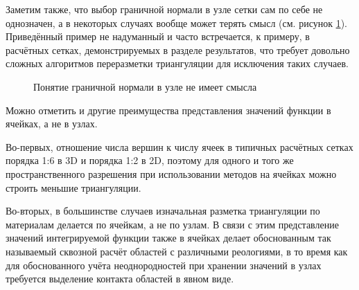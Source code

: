 Заметим также, что выбор граничной нормали в узле сетки сам по себе не однозначен, 
а в некоторых случаях вообще может терять смысл (см. рисунок \ref{pic:bad_normal}). 
Приведённый пример не надуманный и часто встречается, к примеру, в расчётных сетках, 
демонстрируемых в разделе результатов, что требует довольно сложных алгоритмов переразметки 
триангуляции для исключения таких случаев.
\begin{figure}[H]
	\caption{Понятие граничной нормали в узле не имеет смысла}
	\label{pic:bad_normal}
\end{figure}

Можно отметить и другие преимущества представления значений функции в ячейках, а не в узлах. 

Во-первых, отношение числа вершин к числу ячеек в типичных расчётных сетках 
порядка 1:6 в 3D и порядка 1:2 в 2D, 
поэтому для одного и того же пространственного разрешения 
при использовании методов на ячейках можно строить меньшие триангуляции. 

Во-вторых, в большинстве случаев изначальная разметка триангуляции по материалам 
делается по ячейкам, а не по узлам. В связи с этим представление значений 
интегрируемой функции также в ячейках делает обоснованным так называемый сквозной 
расчёт областей с различными реологиями, в то время как для обоснованного 
учёта неоднородностей при хранении значений в узлах требуется выделение контакта 
областей в явном виде. 


